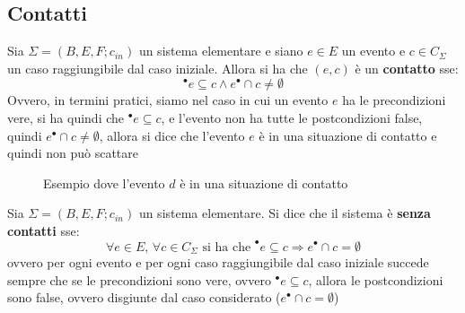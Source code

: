 \documentclass[a4paper,12pt, oneside]{book}
\begin{document}
\subsection{Contatti}
\begin{definizione}
  Sia $\Sigma = (B,E,F;c_{in})$ un sistema elementare e siano $e\in E$ un evento
  e $c\in C_\Sigma$ un caso raggiungibile dal caso iniziale. Allora si ha che
  $(e,c)$ è un \textbf{contatto} sse:
  \[^\bullet e\subseteq c \wedge e^\bullet \cap c \neq\emptyset\]
  Ovvero, in termini pratici, siamo nel caso in cui un evento $e$ ha le
  precondizioni vere, si ha quindi che $^\bullet e\subseteq c$, e l'evento non
  ha tutte le postcondizioni false, quindi $e^\bullet \cap c \neq\emptyset$,
  allora si dice che l'evento $e$ è in una situazione di contatto e quindi non
  può scattare
  \begin{figure}[H]
    \centering
    \caption{Esempio dove l'evento $d$ è in una situazione di
      contatto}
  \end{figure}
\end{definizione}
\begin{definizione}
  Sia $\Sigma = (B,E,F;c_{in})$ un sistema elementare. Si dice che il sistema è
  \textbf{senza contatti} sse:
  \[\forall e\in E,\,\forall c\in C_\Sigma\mbox{ si ha che } ^\bullet
    e\subseteq c\Rightarrow e^\bullet\cap c=\emptyset\]
  ovvero per ogni evento e per ogni caso raggiungibile dal caso iniziale succede
  sempre che se le precondizioni sono vere, ovvero $^\bullet e\subseteq c$,
  allora le postcondizioni sono false, ovvero disgiunte dal caso considerato
  ($e^\bullet\cap c=\emptyset$)
\end{definizione}
\end{document}
